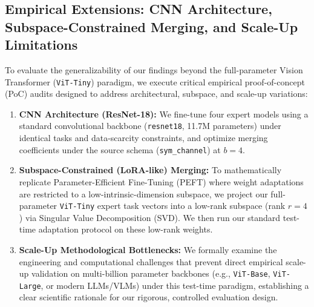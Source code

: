 \subsection{Empirical Extensions: CNN Architecture, Subspace-Constrained Merging, and Scale-Up Limitations}
To evaluate the generalizability of our findings beyond the full-parameter Vision Transformer (\texttt{ViT-Tiny}) paradigm, we execute critical empirical proof-of-concept (PoC) audits designed to address architectural, subspace, and scale-up variations:
\begin{enumerate}
    \item \textbf{CNN Architecture (ResNet-18):} We fine-tune four expert models using a standard convolutional backbone (\texttt{resnet18}, 11.7M parameters) under identical tasks and data-scarcity constraints, and optimize merging coefficients under the source schema (\texttt{sym\_channel}) at $b=4$.
    \item \textbf{Subspace-Constrained (LoRA-like) Merging:} To mathematically replicate Parameter-Efficient Fine-Tuning (PEFT) where weight adaptations are restricted to a low-intrinsic-dimension subspace, we project our full-parameter \texttt{ViT-Tiny} expert task vectors into a low-rank subspace (rank $r=4$) via Singular Value Decomposition (SVD). We then run our standard test-time adaptation protocol on these low-rank weights.
    \item \textbf{Scale-Up Methodological Bottlenecks:} We formally examine the engineering and computational challenges that prevent direct empirical scale-up validation on multi-billion parameter backbones (e.g., \texttt{ViT-Base}, \texttt{ViT-Large}, or modern LLMs/VLMs) under this test-time paradigm, establishing a clear scientific rationale for our rigorous, controlled evaluation design.
\end{enumerate}


